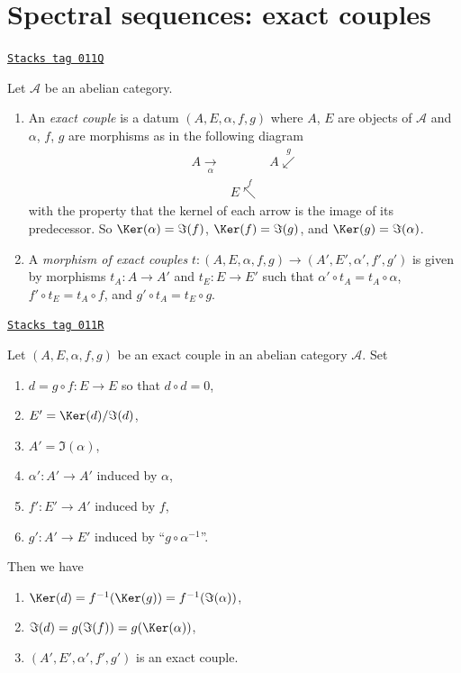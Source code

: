 \section{Spectral sequences: exact couples}
\label{homology-section-exact-couple}
\begin{definition}
\label{homology-definition-exact-couple}
\href{https://stacks.math.columbia.edu/tag/011Q}{\texttt{Stacks tag 011Q}}

Let $\mathcal{A}$ be an abelian category.
\begin{enumerate}
\item An {\it exact couple} is a datum $(A, E, \alpha, f, g)$ where
$A$, $E$ are objects of $\mathcal{A}$ and $\alpha$, $f$, $g$
are morphisms as in the following diagram
$$
\begin{array}{ccc}A \underset{\alpha}{\longrightarrow} &  & A \overset{g}{\swarrow} \\  & E \overset{f}{\nwarrow} & \end{array}
$$
with the property that the kernel of each arrow is the image
of its predecessor. So $\Ker(\alpha) = \Im(f)$,
$\Ker(f) = \Im(g)$, and $\Ker(g) = \Im(\alpha)$.
\item A {\it morphism of exact couples}
$t : (A, E, \alpha, f, g) \to (A', E', \alpha', f', g')$
is given by morphisms $t_A : A \to A'$ and
$t_E : E \to E'$ such that
$\alpha' \circ t_A = t_A \circ \alpha$,
$f' \circ t_E = t_A \circ f$, and
$g' \circ t_A = t_E \circ g$.
\end{enumerate}
\end{definition}

\begin{lemma}
\label{homology-lemma-derived-exact-couple}
\href{https://stacks.math.columbia.edu/tag/011R}{\texttt{Stacks tag 011R}}

Let $(A, E, \alpha, f, g)$ be an exact couple in an abelian category
$\mathcal{A}$. Set
\begin{enumerate}
\item $d = g \circ f : E \to E$ so that $d \circ d = 0$,
\item $E' = \Ker(d)/\Im(d)$,
\item $A' = \Im(\alpha)$,
\item $\alpha' : A' \to A'$ induced by $\alpha$,
\item $f' : E' \to A'$ induced by $f$,
\item $g' : A' \to E'$ induced by ``$g \circ \alpha^{-1}$''.
\end{enumerate}
Then we have
\begin{enumerate}
\item $\Ker(d) = f^{-1}(\Ker(g)) = f^{-1}(\Im(\alpha))$,
\item $\Im(d) = g(\Im(f)) = g(\Ker(\alpha))$,
\item $(A', E', \alpha', f', g')$ is an exact couple.
\end{enumerate}
\end{lemma}

